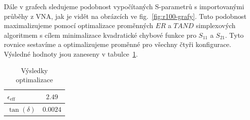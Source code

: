 \documentclass[11pt,a4paper]{article}
\begin{document}
Dále v grafech sledujeme podobnost vypočítaných S-parametrů s importovanými průběhy z VNA, jak je vidět na obrázcích ve fig.~\ref{fig:r100-grafy}. Tuto podobnost maximalizujeme pomocí optimalizace proměnných $\mathit{ER}$ a $\mathit{TAND}$ simplexových algoritmem s cílem minimalizace kvadratické chybové funkce pro $S_{11}$ a $S_{21}$. Tyto rovnice sestavíme a optimalizujeme proměnné pro všechny čtyři konfigurace. Výsledné hodnoty jsou zaneseny v tabulce~\ref{table:vysledky-optimalizace}.
\begin{table}[!ht]
    \centering
    \begin{tabular}{|l||c|}
        \hline
        $\epsilon_{\mathrm{eff}}$ & $2.49$\\
        \hline
        $\tan(\delta)$ & $0.0024$\\
        \hline
    \end{tabular}
    \caption{\label{table:vysledky-optimalizace}Výsledky optimalizace}
\end{table}
\end{document}
